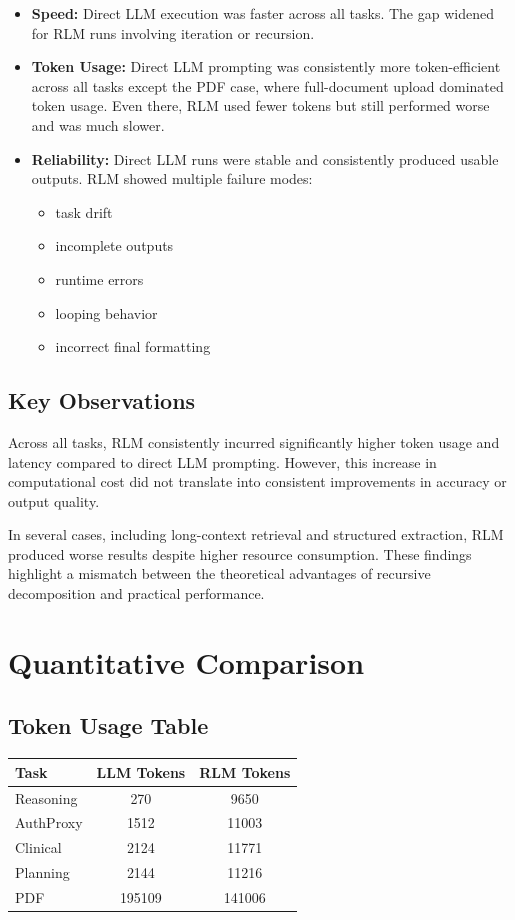 \documentclass{article}
\begin{document}
\begin{itemize}
    \item \textbf{Speed:} Direct LLM execution was faster across all tasks. The gap widened for RLM runs involving iteration or recursion.
    \item \textbf{Token Usage:} Direct LLM prompting was consistently more token-efficient across all tasks except the PDF case, where full-document upload dominated token usage. Even there, RLM used fewer tokens but still performed worse and was much slower.
    \item \textbf{Reliability:} Direct LLM runs were stable and consistently produced usable outputs. RLM showed multiple failure modes:
    \begin{itemize}
        \item task drift
        \item incomplete outputs
        \item runtime errors
        \item looping behavior
        \item incorrect final formatting
    \end{itemize}
\end{itemize}

\subsection{Key Observations}

Across all tasks, RLM consistently incurred significantly higher token usage and latency compared to direct LLM prompting. However, this increase in computational cost did not translate into consistent improvements in accuracy or output quality.

In several cases, including long-context retrieval and structured extraction, RLM produced worse results despite higher resource consumption. These findings highlight a mismatch between the theoretical advantages of recursive decomposition and practical performance.

\section{Quantitative Comparison}

\subsection{Token Usage Table}

\begin{center}
\begin{tabular}{|l|c|c|}
\hline
Task & LLM Tokens & RLM Tokens \\
\hline
Reasoning & 270 & 9650 \\
AuthProxy & 1512 & 11003 \\
Clinical & 2124 & 11771 \\
Planning & 2144 & 11216 \\
PDF & 195109 & 141006 \\
\hline
\end{tabular}
\end{center}
\end{document}
